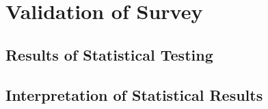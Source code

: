 \section{Validation of Survey}



\subsection{Results of Statistical Testing}

\subsection{Interpretation of Statistical Results}
